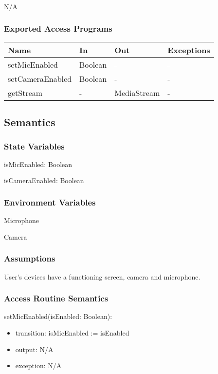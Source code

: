 \documentclass[12pt, titlepage]{article}
\begin{document}
N/A

\subsubsection{Exported Access Programs}

\begin{center}
  \begin{tabular}{p{4cm} p{4cm} p{4cm} p{2cm}}
    \hline
    \textbf{Name}          & \textbf{In}   & \textbf{Out}      & \textbf{Exceptions} \\
    \hline
    setMicEnabled    & Boolean & -           & -             \\
    setCameraEnabled & Boolean & -           & -             \\
    getStream        & -       & MediaStream & -             \\
    \hline
  \end{tabular}
\end{center}

\subsection{Semantics}

\subsubsection{State Variables}

\noindent isMicEnabled: Boolean

\noindent isCameraEnabled: Boolean

\subsubsection{Environment Variables}

\noindent Microphone

\noindent Camera

\subsubsection{Assumptions}

User's devices have a functioning screen, camera and microphone.

\subsubsection{Access Routine Semantics}

\noindent setMicEnabled(isEnabled: Boolean):
\begin{itemize}
\item transition: isMicEnabled := isEnabled
\item output: N/A
\item exception: N/A
\end{itemize}
\end{document}
